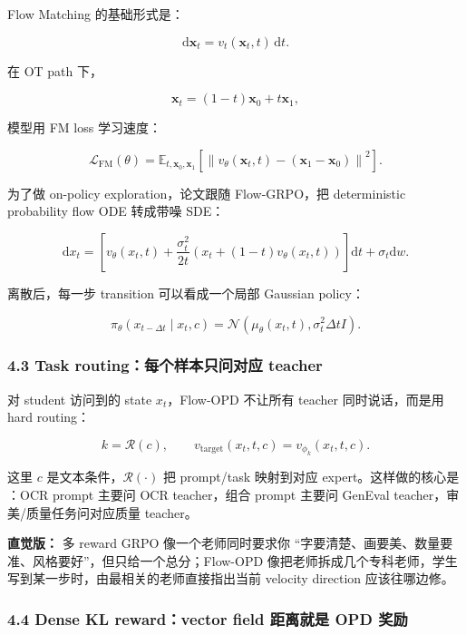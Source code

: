 Flow Matching 的基础形式是：

\[
\mathrm{d}\mathbf{x}_t = v_t(\mathbf{x}_t,t)\,\mathrm{d}t.
\]

在 OT path 下，

\[
\mathbf{x}_t=(1-t)\mathbf{x}_0+t\mathbf{x}_1,
\]

模型用 FM loss 学习速度：

\[
\mathcal{L}_{\mathrm{FM}}(\theta)
=
\mathbb{E}_{t,\mathbf{x}_0,\mathbf{x}_1}
\left[
\left\|v_\theta(\mathbf{x}_t,t)-(\mathbf{x}_1-\mathbf{x}_0)\right\|^2
\right].
\]

为了做 on-policy exploration，论文跟随 Flow-GRPO，把 deterministic probability flow ODE 转成带噪 SDE：

\[
\mathrm{d}x_t
=
\left[
 v_\theta(x_t,t)+\frac{\sigma_t^2}{2t}\left(x_t+(1-t)v_\theta(x_t,t)\right)
\right]\mathrm{d}t
+\sigma_t\mathrm{d}w.
\]

离散后，每一步 transition 可以看成一个局部 Gaussian policy：

\[
\pi_\theta(x_{t-\Delta t}\mid x_t,c)
=
\mathcal{N}\left(\mu_\theta(x_t,t),\sigma_t^2\Delta t I\right).
\]

\subsubsection{4.3 Task routing：每个样本只问对应 teacher}

对 student 访问到的 state $x_t$，Flow-OPD 不让所有 teacher 同时说话，而是用 hard routing：

\[
k=\mathcal{R}(c),
\qquad
v_{\mathrm{target}}(x_t,t,c)=v_{\phi_k}(x_t,t,c).
\]

这里 $c$ 是文本条件，$\mathcal{R}(\cdot)$ 把 prompt/task 映射到对应 expert。这样做的核心是 ：OCR prompt 主要问 OCR teacher，组合 prompt 主要问 GenEval teacher，审美/质量任务问对应质量 teacher。

\begin{intubox}
\textbf{直觉版：} 多 reward GRPO 像一个老师同时要求你 ``字要清楚、画要美、数量要准、风格要好''，但只给一个总分；Flow-OPD 像把老师拆成几个专科老师，学生写到某一步时，由最相关的老师直接指出当前 velocity direction 应该往哪边修。
\end{intubox}

\subsubsection{4.4 Dense KL reward：vector field 距离就是 OPD 奖励}

